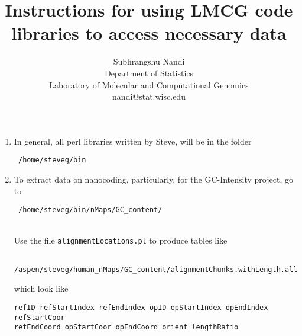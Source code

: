 \documentclass[11pt]{article}
\begin{document}
\title{Instructions for using LMCG code libraries to access necessary data}
\author{Subhrangshu Nandi\\
  Department of Statistics\\
  Laboratory of Molecular and Computational Genomics\\
  nandi@stat.wisc.edu}
\maketitle

\begin{enumerate}
\item
In general, all perl libraries written by Steve, will be in the folder \begin{verbatim} /home/steveg/bin \end{verbatim}
\item
To extract data on nanocoding, particularly, for the GC-Intensity project, go to \begin{verbatim} /home/steveg/bin/nMaps/GC_content/ \end{verbatim} \\
Use the file \texttt{alignmentLocations.pl} to produce tables like \begin{verbatim} /aspen/steveg/human_nMaps/GC_content/alignmentChunks.withLength.all7134Groups.goldOnly \end{verbatim} which look like
\begin{verbatim}
refID refStartIndex refEndIndex opID opStartIndex opEndIndex refStartCoor 
refEndCoord opStartCoor opEndCoord orient lengthRatio


\end{verbatim}
\end{enumerate}
\end{document}
